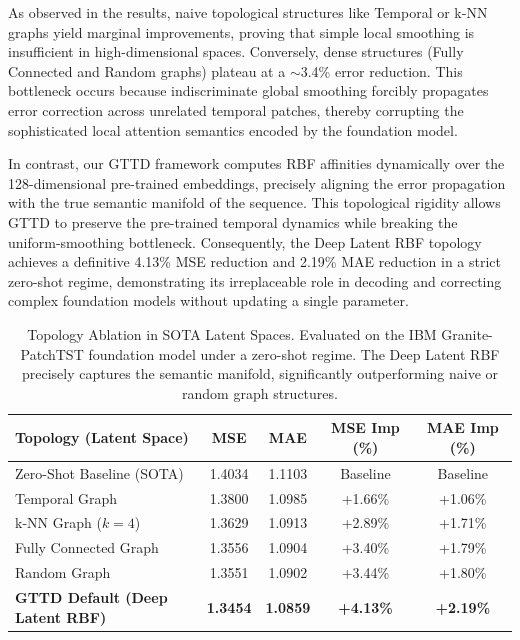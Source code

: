 \documentclass{article}
\begin{document}
As observed in the results, naive topological structures like Temporal or k-NN graphs yield marginal improvements, proving that simple local smoothing is insufficient in high-dimensional spaces. Conversely, dense structures (Fully Connected and Random graphs) plateau at a $\sim$3.4\% error reduction. This bottleneck occurs because indiscriminate global smoothing forcibly propagates error correction across unrelated temporal patches, thereby corrupting the sophisticated local attention semantics encoded by the foundation model. 

In contrast, our GTTD framework computes RBF affinities dynamically over the 128-dimensional pre-trained embeddings, precisely aligning the error propagation with the true semantic manifold of the sequence. This topological rigidity allows GTTD to preserve the pre-trained temporal dynamics while breaking the uniform-smoothing bottleneck. Consequently, the Deep Latent RBF topology achieves a definitive 4.13\% MSE reduction and 2.19\% MAE reduction in a strict zero-shot regime, demonstrating its irreplaceable role in decoding and correcting complex foundation models without updating a single parameter.

\begin{table}[t] %
\centering
\caption{Topology Ablation in SOTA Latent Spaces. Evaluated on the IBM Granite-PatchTST foundation model under a zero-shot regime. The Deep Latent RBF precisely captures the semantic manifold, significantly outperforming naive or random graph structures.}
\label{tab:latent_ablation}
\begin{tabular}{lcccc}
\toprule
\textbf{Topology (Latent Space)} & \textbf{MSE} & \textbf{MAE} & \textbf{MSE Imp (\%)} & \textbf{MAE Imp (\%)} \\
\midrule
Zero-Shot Baseline (SOTA) & 1.4034 & 1.1103 & Baseline & Baseline \\
\midrule
Temporal Graph & 1.3800 & 1.0985 & +1.66\% & +1.06\% \\
k-NN Graph ($k=4$) & 1.3629 & 1.0913 & +2.89\% & +1.71\% \\
Fully Connected Graph & 1.3556 & 1.0904 & +3.40\% & +1.79\% \\
Random Graph & 1.3551 & 1.0902 & +3.44\% & +1.80\% \\
\midrule
\textbf{GTTD Default (Deep Latent RBF)} & \textbf{1.3454} & \textbf{1.0859} & \textbf{+4.13\%} & \textbf{+2.19\%} \\
\bottomrule
\end{tabular}
\end{table}
\end{document}
